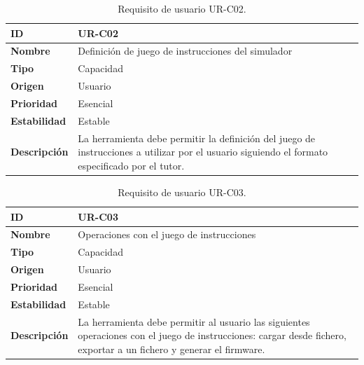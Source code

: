 \begin{center}
\begin{table}[htbp]
\centering
\caption{Requisito de usuario UR-C02.}
\begin{tabular}{@{}p{2.5cm} p{9cm}@{}} 
\toprule
\textbf{ID} 				& UR-C02 \\
\midrule
\textbf{Nombre} 			& Definición de juego de instrucciones del simulador \\
\midrule
\textbf{Tipo} 			& Capacidad \\
\midrule
\textbf{Origen} 			& Usuario \\
\midrule
\textbf{Prioridad}		& Esencial \\
\midrule
\textbf{Estabilidad} 		& Estable \\
\midrule
\textbf{Descripción} 	& La herramienta debe permitir la definición del juego de instrucciones a utilizar por el usuario siguiendo el formato especificado por el tutor. \\
\bottomrule
\end{tabular}
\label{tab:urc02}
\end{table}
\end{center}

\begin{center}
\begin{table}[htbp]
\centering
\caption{Requisito de usuario UR-C03.}
\begin{tabular}{@{}p{2.5cm} p{9cm}@{}} 
\toprule
\textbf{ID} 				& UR-C03 \\
\midrule
\textbf{Nombre} 			& Operaciones con el juego de instrucciones \\
\midrule
\textbf{Tipo} 			& Capacidad \\
\midrule
\textbf{Origen} 			& Usuario \\
\midrule
\textbf{Prioridad}		& Esencial \\
\midrule
\textbf{Estabilidad} 		& Estable \\
\midrule
\textbf{Descripción} 	& La herramienta debe permitir al usuario las siguientes operaciones con el juego de instrucciones: cargar desde fichero, exportar a un fichero y generar el firmware. \\
\bottomrule
\end{tabular}
\label{tab:urc03}
\end{table}
\end{center}

